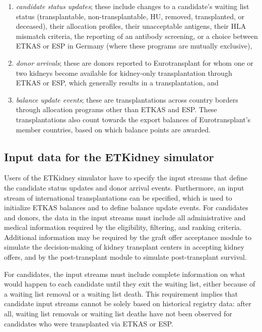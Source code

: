 \documentclass[11pt,twoside,]{book}
\begin{document}
\begin{enumerate}
\def\labelenumi{\arabic{enumi}.}
\item
  \emph{candidate status updates}; these include changes to a candidate's waiting
  list status (transplantable, non-transplantable, HU, removed, transplanted,
  or deceased), their allocation profiles, their unacceptable antigens,
  their HLA mismatch criteria, the reporting of an antibody screening,
  or a choice between ETKAS or ESP in Germany (where these programs are mutually exclusive),
\item
  \emph{donor arrivals}; these are donors reported to Eurotransplant for whom one or two kidneys become available for kidney-only transplantation through ETKAS or ESP, which generally
  results in a transplantation, and
\item
  \emph{balance update events}; these are transplantations across country borders
  through allocation programs other than ETKAS and ESP. These transplantations
  also count towards the export balances of Eurotransplant's member countries, based
  on which balance points are awarded.
\end{enumerate}

\subsection{Input data for the ETKidney simulator}\label{sec:etkidneyinputstreams}

Users of the ETKidney simulator have to specify the input streams that
define the candidate status updates and donor arrival events. Furthermore, an input stream of
international transplantations can be specified, which is used to
initialize ETKAS balances and to define balance update events. For candidates
and donors, the data in the input streams must include
all administrative and medical information required by the eligibility,
filtering, and ranking criteria. Additional information may be required
by the graft offer acceptance module to simulate the decision-making of kidney
transplant centers in accepting kidney offers, and by the post-transplant module to simulate post-transplant
survival.

For candidates, the input streams must include complete information on
what would happen to each candidate until they exit the waiting list,
either because of a waiting list removal or a waiting list death. This requirement
implies that candidate input streams cannot
be solely based on historical registry data: after all, waiting list
removals or waiting list deaths have not been observed for candidates who were
transplanted via ETKAS or ESP.
\end{document}
